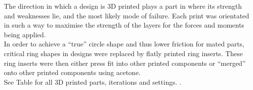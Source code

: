 The direction in which a design is 3D printed plays a part in where its strength and weaknesses lie, and the most likely mode of failure. Each print was orientated in such a way to maximise the strength of the layers for the forces and moments being applied.\\

In order to achieve a ``true'' circle shape and thus lower friction for mated parts, critical ring shapes in designs were replaced by flatly printed ring inserts. These ring inserts were then either press fit into other printed components or ``merged'' onto other printed components using acetone.\\

See Table \red{[REF]} for all 3D printed parts, iterations and settings.  .

	

